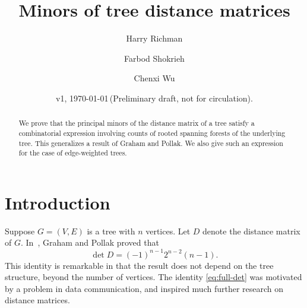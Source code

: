 \documentclass{amsart}
\theoremstyle{definition}
\begin{document}
\title[Tree distance minors]{Minors of tree distance matrices}
\author{Harry Richman}
\author{Farbod Shokrieh}
\author{Chenxi Wu}
\date{v1, \today  \,(Preliminary draft, not for circulation).}


\begin{abstract}
We prove that %
the principal minors of
the distance matrix of a tree %
satisfy a combinatorial expression involving counts of rooted spanning forests of the underlying tree.
This generalizes a result of Graham and Pollak.
We also give such an expression for the case of edge-weighted trees.
\end{abstract}
\maketitle

\setcounter{tocdepth}{1}
\tableofcontents

\section{Introduction}

Suppose $G = (V,E)$ is a tree with $n$ vertices.
Let $D$ denote the distance matrix of $G$.
In~\cite{graham-pollak}, Graham and Pollak proved that
\begin{equation}\label{eq:full-det}
\det D = (-1)^{n-1} 2^{n-2} (n-1). 
\end{equation}
This identity is remarkable in that the result does not depend on the tree structure,
beyond the number of vertices.
The identity \eqref{eq:full-det} was motivated by a problem in data communication,
and inspired much further research on distance matrices.
\end{document}
